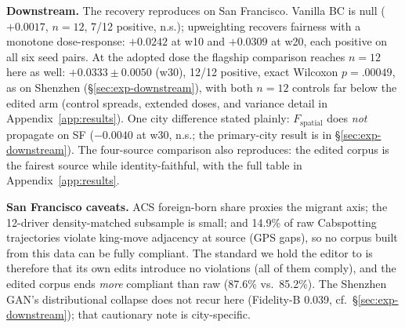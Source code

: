 \textbf{Downstream.} The recovery reproduces on San Francisco. Van\-illa BC is
null ($+0.0017$, $n = 12$, 7/12 positive, n.s.); upweighting recovers
fairness with a monotone dose-response: $+0.0242$ at w10 and $+0.0309$
at w20, each positive on all six seed pairs. At the
adopted dose the flagship comparison reaches $n = 12$ here as well:
$+0.0333 \pm 0.0050$ (w30), 12/12 positive, exact Wilcoxon $p = .00049$,
as on Shenzhen (\S\ref{sec:exp-downstream}), with both $n = 12$ controls
far below the edited arm (control spreads, extended doses, and variance
detail in Appendix~\ref{app:results}).
One city difference stated plainly:
$F_{\mathrm{spatial}}$ does \emph{not} propagate on SF ($-0.0040$ at w30,
n.s.; the primary-city result is in \S\ref{sec:exp-downstream}).
The four-source comparison also reproduces: the edited corpus is the fairest
source while identity-faithful, with the full table in
Appendix~\ref{app:results}.

\textbf{San Francisco caveats.} ACS foreign-born share proxies the migrant 
axis; the 12-driver density-matched subsample is small; and 14.9\% of raw
Cabspotting trajectories violate king-move adjacency at source (GPS gaps),
so no corpus built from this data can be fully compliant. The standard we
hold the editor to is therefore that its own edits introduce no violations
(all of them comply), and the edited corpus ends \emph{more} compliant than
raw (87.6\% vs.\ 85.2\%). The Shenzhen GAN's distributional collapse does
not recur here (Fidelity-B 0.039, cf.\ \S\ref{sec:exp-downstream}); that
cautionary note is city-specific.
